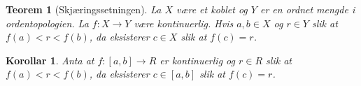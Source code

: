 \documentclass[12pt, aspectratio=169, noamssymb]{beamer}
\theoremstyle{newstyle}
\newtheorem{teorem}{\normalsize \color{white} \bfseries Teorem}
\newtheorem{korollar}{\normalsize \color{white} \bfseries Korollar}
\begin{document}
    \begin{frame}
        \begin{teorem}[Skjæringssetningen]
            La $X$ være et koblet og $Y$ er en ordnet mengde i ordentopologien. La $f: X \to Y$ være kontinuerlig. Hvis $a,b \in X$ og $r \in Y$ slik at $f(a) <r < f(b)$, da eksisterer $c \in X$ slik at $f(c) = r$. 
        \end{teorem}
        \begin{korollar}
            Anta at $f:[a,b] \to R$ er kontinuerlig og $r \in R$ slik at $f(a) <r < f(b)$, da eksisterer $c \in [a,b]$ slik at $f(c) = r$. 
        \end{korollar}
    \end{frame}
\end{document}
